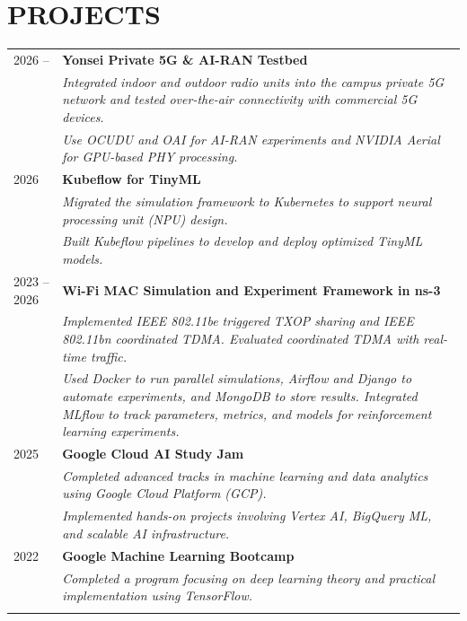 \documentclass[a4paper,9pt]{extarticle}
\begin{document}
\section*{PROJECTS}
\noindent
\begin{tabularx}{\textwidth}{@{} p{2cm} X @{}}
    2026 --     & \textbf{Yonsei Private 5G \& AI-RAN Testbed} \\
                & \textit{Integrated indoor and outdoor radio units into the campus private 5G network and tested over-the-air connectivity with commercial 5G devices.} \\
                & \textit{Use OCUDU and OAI for AI-RAN experiments and NVIDIA Aerial for GPU-based PHY processing.} \\ \addlinespace[0.5em]

    2026        & \textbf{Kubeflow for TinyML} \\
                & \textit{Migrated the simulation framework to Kubernetes to support neural processing unit (NPU) design.} \\
                & \textit{Built Kubeflow pipelines to develop and deploy optimized TinyML models.} \\ \addlinespace[0.5em]
                
    2023 -- 2026 & \textbf{Wi-Fi MAC Simulation and Experiment Framework in ns-3} \\
                & \textit{Implemented IEEE 802.11be triggered TXOP sharing and IEEE 802.11bn coordinated TDMA. Evaluated coordinated TDMA with real-time traffic.} \\
                & \textit{Used Docker to run parallel simulations, Airflow and Django to automate experiments, and MongoDB to store results. Integrated MLflow to track parameters, metrics, and models for reinforcement learning experiments.} \\ \addlinespace[0.5em]
    
    2025        & \textbf{Google Cloud AI Study Jam} \\
                &  \textit{Completed advanced tracks in machine learning and data analytics using Google Cloud Platform (GCP).} \\
                & \textit{Implemented hands-on projects involving Vertex AI, BigQuery ML, and scalable AI infrastructure.} \\ \addlinespace[0.5em]
    
    2022        & \textbf{Google Machine Learning Bootcamp} \\
                &  \textit{Completed a program focusing on deep learning theory and practical implementation using TensorFlow.} \\ \addlinespace[0.5em]
    
\end{tabularx}
\end{document}
